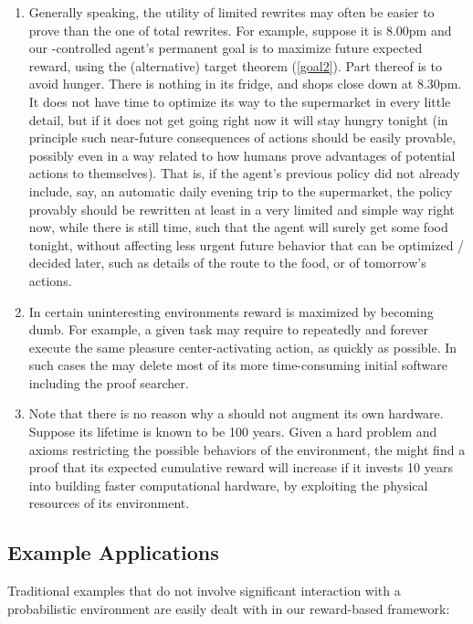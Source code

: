 \begin{enumerate}
\item
\label{supermarket}
Generally speaking,
the utility of limited rewrites may often be
easier to prove than the one of total rewrites.
For example, suppose it is 8.00pm and our \gmn-controlled
agent's permanent goal is to
maximize future expected reward, using the (alternative)
target theorem (\ref{goal2}).  Part thereof is to avoid hunger. There
is nothing in its fridge, and shops close down at 8.30pm.  It does not
have time to optimize its way to the supermarket in  every little detail,
but if it does not get going right now it will stay hungry tonight (in
principle such near-future consequences of actions should be easily
provable, possibly even in a way related to
how humans prove advantages of potential actions to themselves). That
is, if the agent's previous policy did not already include, say, an automatic
daily evening trip to the supermarket, the policy provably should be
rewritten at least in a very limited and simple way right now, while there
is still time, such that the agent will surely get some food tonight,
without affecting less urgent future behavior that  can be optimized
/ decided later, such as details of the route to the food, or
of tomorrow's actions.
 
\item
 In certain uninteresting environments reward
 is maximized by becoming dumb. For example,
 a given task may require to repeatedly
 and forever execute the same pleasure center-activating action,
 as quickly as possible.  In such cases the \gm may delete
 most of its more time-consuming initial software
 including the proof searcher.
  
\item
  Note that there is no reason why a \gm should not
  augment its own hardware.
  Suppose its lifetime is known to be 100 years.
  Given a hard problem and
  axioms restricting the possible
  behaviors of the environment,
  the \gm might find a proof that its
  expected cumulative reward will increase if
  it invests 10 years into building faster computational
  hardware, by exploiting the physical resources of
  its environment.
\end{enumerate}

\subsection{Example Applications}
\label{examples}

Traditional examples that
do not involve significant interaction with a probabilistic
environment are easily dealt with in our reward-based framework:


